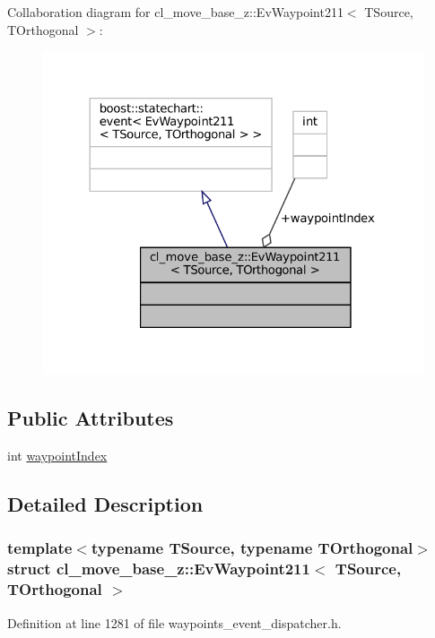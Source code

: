 Collaboration diagram for cl\+\_\+move\+\_\+base\+\_\+z\+:\+:Ev\+Waypoint211$<$ T\+Source, T\+Orthogonal $>$\+:
\nopagebreak
\begin{figure}[H]
\begin{center}
\leavevmode
\includegraphics[width=324pt]{structcl__move__base__z_1_1EvWaypoint211__coll__graph}
\end{center}
\end{figure}
\subsection*{Public Attributes}
\begin{DoxyCompactItemize}
\item 
int \hyperlink{structcl__move__base__z_1_1EvWaypoint211_a6e15337060cce2a09aee80515f57ab2f}{waypoint\+Index}
\end{DoxyCompactItemize}


\subsection{Detailed Description}
\subsubsection*{template$<$typename T\+Source, typename T\+Orthogonal$>$\newline
struct cl\+\_\+move\+\_\+base\+\_\+z\+::\+Ev\+Waypoint211$<$ T\+Source, T\+Orthogonal $>$}



Definition at line 1281 of file waypoints\+\_\+event\+\_\+dispatcher.\+h.



